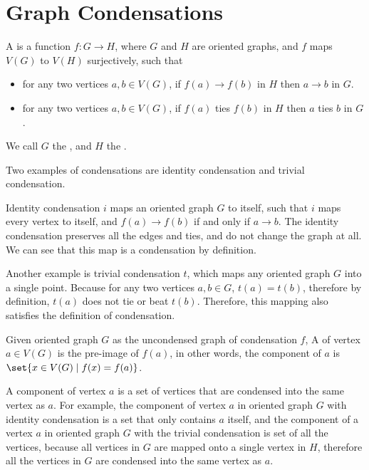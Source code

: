 \section{Graph Condensations}\label{sec: graph condensation}

\begin{definition}
  A  is a function \(f: G \to H\),
  where \(G\) and \(H\) are oriented graphs,
  and \(f\) maps \(V(G)\) to \(V(H)\) surjectively,
  such that
  \begin{itemize}
    \item for any two vertices \(a, b \in V(G)\),
      if \(f(a) \to f(b)\) in \(H\)
      then \(a \to b\) in \(G\).
    \item for any two vertices \(a, b \in V(G)\),
      if \(f(a)\) ties \(f(b)\) in \(H\)
      then \(a\) ties \(b\) in \(G\).
  \end{itemize}
  We call \(G\) the ,
  and \(H\) the .
\end{definition}

Two examples of condensations are identity condensation
and trivial condensation.

Identity condensation \(i\) maps an oriented graph \(G\) to itself,
such that \(i\) maps every vertex to itself,
and \(f(a) \to f(b)\) if and only if \(a \to b\).
The identity condensation preserves all the edges
and ties, and do not change the graph at all.
We can see that this map is a condensation by definition.

Another example is trivial condensation \(t\),
which maps any oriented graph \(G\) into a single point.
Because for any two vertices \(a, b \in G\),
\(t(a) = t(b)\), therefore by definition,
\(t(a)\) does not tie or beat \(t(b)\).
Therefore, this mapping also satisfies
the definition of condensation.

\begin{definition}
  Given oriented graph \(G\) as the uncondensed graph of
  condensation \(f\),
  A  of vertex \(a \in V(G)\)
  is the pre-image of \(f(a)\),
  in other words, the component of \(a\) is
  \(\set{x \in V(G) \mid f(x) = f(a)}\).
\end{definition}

A component of vertex \(a\) is a set of vertices
that are condensed into the same vertex as \(a\).
For example, the component of vertex \(a\)
in oriented graph \(G\) with identity condensation
is a set that only contains \(a\) itself,
and the component of a vertex \(a\) in oriented graph \(G\)
with the trivial condensation is set of all the vertices,
because all vertices in \(G\) are mapped onto a
single vertex in \(H\),
therefore all the vertices in \(G\) are
condensed into the same vertex as \(a\).

